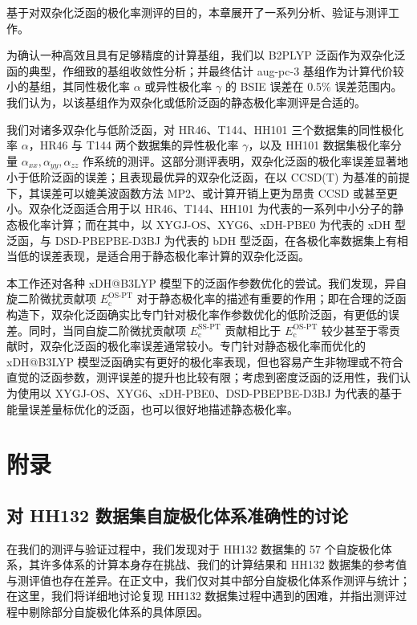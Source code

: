 基于对双杂化泛函的极化率测评的目的，本章展开了一系列分析、验证与测评工作。

为确认一种高效且具有足够精度的计算基组，我们以 B2PLYP 泛函作为双杂化泛函的典型，作细致的基组收敛性分析；并最终估计 aug-pc-3 基组作为计算代价较小的基组，其同性极化率 $\alpha$ 或异性极化率 $\gamma$ 的 BSIE 误差在 0.5\% 误差范围内。我们认为，以该基组作为双杂化或低阶泛函的静态极化率测评是合适的。

我们对诸多双杂化与低阶泛函，对 HR46、T144、HH101 三个数据集的同性极化率 $\alpha$，HR46 与 T144 两个数据集的异性极化率 $\gamma$，以及 HH101 数据集极化率分量 $\alpha_{xx}, \alpha_{yy}, \alpha_{zz}$ 作系统的测评。这部分测评表明，双杂化泛函的极化率误差显著地小于低阶泛函的误差；且表现最优异的双杂化泛函，在以 CCSD(T) 为基准的前提下，其误差可以媲美波函数方法 MP2、或计算开销上更为昂贵 CCSD 或甚至更小。双杂化泛函适合用于以 HR46、T144、HH101 为代表的一系列中小分子的静态极化率计算；而在其中，以 XYGJ-OS、XYG6、xDH-PBE0 为代表的 xDH 型泛函，与 DSD-PBEPBE-D3BJ 为代表的 bDH 型泛函，在各极化率数据集上有相当低的误差表现，是适合用于静态极化率计算的双杂化泛函。

本工作还对各种 xDH@B3LYP 模型下的泛函作参数优化的尝试。我们发现，异自旋二阶微扰贡献项 $E_\mathrm{c}^\text{OS-PT}$ 对于静态极化率的描述有重要的作用；即在合理的泛函构造下，双杂化泛函确实比专门针对极化率作参数优化的低阶泛函，有更低的误差。同时，当同自旋二阶微扰贡献项 $E_\mathrm{c}^\text{SS-PT}$ 贡献相比于 $E_\mathrm{c}^\text{OS-PT}$ 较少甚至于零贡献时，双杂化泛函的极化率误差通常较小。专门针对静态极化率而优化的 xDH@B3LYP 模型泛函确实有更好的极化率表现，但也容易产生非物理或不符合直觉的泛函参数，测评误差的提升也比较有限；考虑到密度泛函的泛用性，我们认为使用以 XYGJ-OS、XYG6、xDH-PBE0、DSD-PBEPBE-D3BJ 为代表的基于能量误差量标优化的泛函，也可以很好地描述静态极化率。

\section{附录}

\subsection{对 HH132 数据集自旋极化体系准确性的讨论}
\label{sec.6.supp-HH132-remove}

在我们的测评与验证过程中，我们发现对于 HH132 数据集\cite{Hait-Head-Gordon.PCCP.2018}的 57 个自旋极化体系，其许多体系的计算本身存在挑战、我们的计算结果和 HH132 数据集的参考值与测评值也存在差异。在正文中，我们仅对其中部分自旋极化体系作测评与统计；在这里，我们将详细地讨论复现 HH132 数据集过程中遇到的困难，并指出测评过程中剔除部分自旋极化体系的具体原因。

